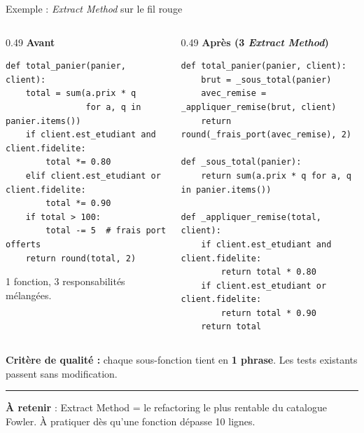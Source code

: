 \documentclass[aspectratio=169,11pt]{beamer}
\newcommand{\takeaway}[1]{%
\vfill\begin{beamercolorbox}[wd=\linewidth,sep=0.4em]{}
\color{accent2}\rule[0.6ex]{1.2em}{1.2pt}\hspace{0.4em}%
\textbf{\color{accent2}\small À retenir} \textcolor{textsoft}{:} %
{\small\color{textmain}#1}
\end{beamercolorbox}}
\begin{document}
\begin{frame}[fragile,t,shrink=18]{Exemple : \emph{Extract Method} sur le fil rouge}
\begin{columns}[T,onlytextwidth]
\begin{column}{0.49\textwidth}
\textbf{Avant}
\begin{lstlisting}[style=pythondark]
def total_panier(panier, client):
    total = sum(a.prix * q
                for a, q in panier.items())
    if client.est_etudiant and client.fidelite:
        total *= 0.80
    elif client.est_etudiant or client.fidelite:
        total *= 0.90
    if total > 100:
        total -= 5  # frais port offerts
    return round(total, 2)
\end{lstlisting}
{\color{textsoft}\scriptsize 1 fonction, 3 responsabilités mélangées.}
\end{column}
\begin{column}{0.49\textwidth}
\textbf{Après (3 \emph{Extract Method})}
\begin{lstlisting}[style=pythondark]
def total_panier(panier, client):
    brut = _sous_total(panier)
    avec_remise = _appliquer_remise(brut, client)
    return round(_frais_port(avec_remise), 2)

def _sous_total(panier):
    return sum(a.prix * q for a, q in panier.items())

def _appliquer_remise(total, client):
    if client.est_etudiant and client.fidelite:
        return total * 0.80
    if client.est_etudiant or client.fidelite:
        return total * 0.90
    return total
\end{lstlisting}
\end{column}
\end{columns}
\vspace{0.3em}\footnotesize
\textbf{Critère de qualité :} chaque sous-fonction tient en \textbf{1 phrase}. Les tests existants passent sans modification.
\takeaway{Extract Method = le refactoring le plus rentable du catalogue Fowler. À pratiquer dès qu'une fonction dépasse 10 lignes.}
\end{frame}
\end{document}
